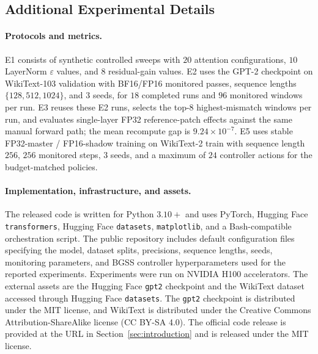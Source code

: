 \documentclass[twoside]{article}
\theoremstyle{definition}
\theoremstyle{remark}
\begin{document}
\subsection{Additional Experimental Details}
\label{app:exp-details}

\paragraph{Protocols and metrics.}
E1 consists of synthetic controlled sweeps with $20$ attention configurations,
$10$ LayerNorm $\varepsilon$ values, and $8$ residual-gain values. E2 uses the
GPT-2 checkpoint \citep{Radford2019language} on WikiText-103
\citep{Merity2016pointer} validation with BF16/FP16 monitored passes, sequence
lengths $\{128,512,1024\}$, and $3$ seeds, for $18$ completed runs and $96$
monitored windows per run. E3 reuses these E2 runs, selects the top-$8$
highest-mismatch windows per run, and evaluates single-layer FP32
reference-patch effects against the same manual forward path; the mean
recompute gap is
$9.24\times 10^{-7}$. E5 uses stable FP32-master / FP16-shadow training on
WikiText-2 train with sequence length $256$, $256$ monitored steps, $3$ seeds,
and a maximum of $24$ controller actions for the budget-matched policies.

\paragraph{Implementation, infrastructure, and assets.}
The released code is written for Python $3.10+$ and uses PyTorch, Hugging Face
\texttt{transformers}, Hugging Face \texttt{datasets}, \texttt{matplotlib}, and
a Bash-compatible orchestration script. The public repository includes default
configuration files specifying the model, dataset splits, precisions, sequence
lengths, seeds, monitoring parameters, and BGSS controller hyperparameters used
for the reported experiments. Experiments were run on NVIDIA H100 accelerators.
The external assets are the Hugging Face \texttt{gpt2} checkpoint and the
WikiText dataset accessed through Hugging Face \texttt{datasets}. The
\texttt{gpt2} checkpoint is distributed under the MIT license, and WikiText is
distributed under the Creative Commons Attribution-ShareAlike license
(CC BY-SA 4.0). The official code release is provided at the URL in
Section~\ref{sec:introduction} and is released under the MIT license.
\end{document}
